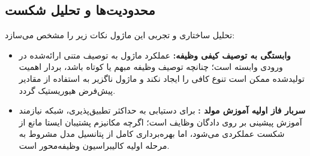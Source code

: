 \subsection{محدودیت‌ها و تحلیل شکست}
تحلیل ساختاری و تجربی این ماژول نکات زیر را مشخص می‌سازد:
\begin{itemize}
    \item \textbf{وابستگی به توصیف کیفی وظیفه:} عملکرد ماژول به توصیف متنی ارائه‌شده در ورودی وابسته است؛ چنانچه توصیف وظیفه مبهم یا کوتاه باشد، بردار اهمیت تولیدشده ممکن است تنوع کافی را ایجاد نکند و ماژول ناگزیر به استفاده از مقادیر پیش‌فرض هیوریستیک گردد.
    \item \textbf{سربار فاز اولیه آموزش مولد :} برای دستیابی به حداکثر تطبیق‌پذیری، شبکه  نیازمند آموزش پیشینی بر روی دادگان وظایف است؛ اگرچه مکانیزم پشتیبان ایستا مانع از شکست عملکردی می‌شود، اما بهره‌برداری کامل از پتانسیل مدل مشروط به مرحله اولیه کالیبراسیون وظیفه‌محور است.
\end{itemize}
